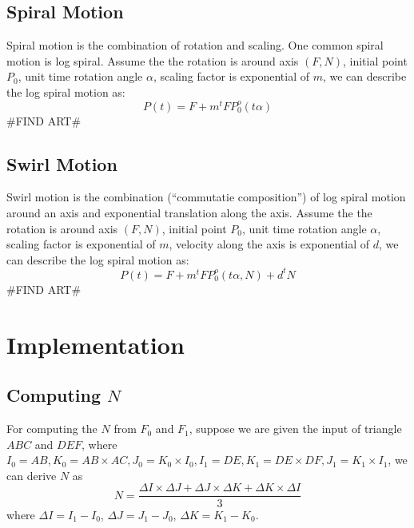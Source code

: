 \documentclass[twoside,11pt]{article}
\begin{document}
\subsection{Spiral Motion}
Spiral motion is the combination of rotation and scaling. One common spiral motion is log spiral. Assume the the rotation is around axis $(F, N)$, initial point $P_0$, unit time rotation angle $\alpha$, scaling factor is exponential of $m$, we can describe the log spiral motion as:
\begin{equation}
P(t) = F + m^t FP_0^o(t\alpha)
\end{equation}
\#FIND ART\#

\subsection{Swirl Motion}
Swirl motion is the combination (``commutatie composition'') of log spiral motion around an axis and exponential translation along the axis. Assume the the rotation is around axis $(F, N)$, initial point $P_0$, unit time rotation angle $\alpha$, scaling factor is exponential of $m$, velocity along the axis is exponential of $d$, we can describe the log spiral motion as:
\begin{equation}
P(t) = F + m^t FP_0^o(t\alpha, N) + d^t N
\end{equation}
\#FIND ART\#

\section{Implementation}


\subsection{Computing $N$}

For computing the $N$ from $F_0$ and $F_1$, suppose we are given the input of triangle $ABC$ and $DEF$, where $I_0 = AB, K_0 = AB \times AC, J_0 = K_0 \times I_0, I_1 = DE, K_1 =  DE \times DF, J_1 = K_1 \times I_1$, we can derive $N$ as
\begin{equation}
N = \frac{\Delta I \times \Delta J + \Delta J \times \Delta K + \Delta K \times \Delta I}{3}
\end{equation}
where $\Delta I = I_1 - I_0$, $\Delta J = J_1 - J_0$, $\Delta K = K_1 - K_0$.
\end{document}
